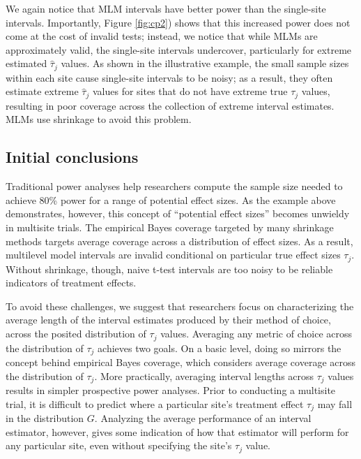 \documentclass[]{article}
\begin{document}
We again notice that MLM intervals have better power than the single-site intervals.
Importantly, Figure \ref{fig:cp2}) shows that this increased power does not come at the cost of invalid tests; instead, we notice that while MLMs are approximately valid, the single-site intervals undercover, particularly for extreme estimated $\hat{\tau}_j$ values.
As shown in the illustrative example, the small sample sizes within each site cause single-site intervals to be noisy; as a result, they often estimate extreme $\hat{\tau}_j$ values for sites that do not have extreme true $\tau_j$ values, resulting in poor coverage across the collection of extreme interval estimates.
MLMs use shrinkage to avoid this problem.

\subsection{Initial conclusions}

Traditional power analyses help researchers compute the sample size needed to achieve 80\% power for a range of potential effect sizes.
As the example above demonstrates, however, this concept of ``potential effect sizes'' becomes unwieldy in multisite trials.
The empirical Bayes coverage targeted by many shrinkage methods targets average coverage across a distribution of effect sizes.
As a result, multilevel model intervals are invalid conditional on particular true effect sizes $\tau_j$.
Without shrinkage, though, naive t-test intervals are too noisy to be reliable indicators of treatment effects.

To avoid these challenges, we suggest that researchers focus on characterizing the average length of the interval estimates produced by their method of choice, across the posited distribution of $\tau_j$ values.
Averaging any metric of choice across the distribution of $\tau_j$ achieves two goals.
On a basic level, doing so mirrors the concept behind empirical Bayes coverage, which considers average coverage across the distribution of $\tau_j$.
More practically, averaging interval lengths across $\tau_j$ values results in simpler prospective power analyses.
Prior to conducting a multisite trial, it is difficult to predict where a particular site's treatment effect $\tau_j$ may fall in the distribution $G$.
Analyzing the average performance of an interval estimator, however, gives some indication of how that estimator will perform for any particular site, even without specifying the site's $\tau_j$ value.
\end{document}
